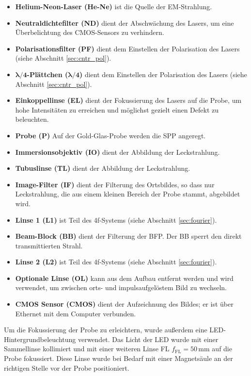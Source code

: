 \documentclass[a4paper, titlepage,  ngerman]{book}
\begin{document}
		\begin{itemize}
			\item \textbf{Helium-Neon-Laser (He-Ne)} ist die Quelle der EM-Strahlung.
			\item \textbf{Neutraldichtefilter (ND)} dient der Abschwächung des Lasers, um eine Überbelichtung des CMOS-Sensors zu verhindern.
			\item \textbf{Polarisationsfilter (PF)} dient dem Einstellen der Polarisation des Lasers (siehe Abschnitt \ref{sec:cntr_pol}).
			\item $\boldsymbol{\lambda / 4}$\textbf{-Plättchen (}$\boldsymbol{\lambda / 4}$\textbf{)} dient dem Einstellen der Polarisation des Lasers (siehe Abschnitt \ref{sec:cntr_pol}).
			\item \textbf{Einkoppellinse (EL)} dient der Fokussierung des Lasers auf die Probe, um hohe Intensitäten zu erreichen und möglichst gezielt einen Defekt zu beleuchten.
			\item \textbf{Probe (P)} Auf der Gold-Glas-Probe werden die SPP angeregt.
			\item \textbf{Immersionsobjektiv (IO)} dient der Abbildung der Leckstrahlung.
			\item \textbf{Tubuslinse (TL)} dient der Abbildung der Leckstrahlung.
			\item \textbf{Image-Filter (IF)} dient der Filterung des Ortsbildes, so dass nur Leckstrahlung, die aus einem kleinen Bereich der Probe stammt, abgebildet wird.			
			\item \textbf{Linse 1 (L1)} ist Teil des 4f-Systems (siehe Abschnitt \ref{sec:fourier}).
			\item \textbf{Beam-Block (BB)} dient der Filterung der BFP. Der BB sperrt den direkt transmittierten Strahl.			
			\item \textbf{Linse 2 (L2)} ist Teil des 4f-Systems (siehe Abschnitt \ref{sec:fourier}).
			\item \textbf{Optionale Linse (OL)} kann aus dem Aufbau entfernt werden und wird verwendet, um zwischen orts- und impulsaufgelöstem Bild zu wechseln.
			\item \textbf{CMOS Sensor (CMOS)}  dient der Aufzeichnung des Bildes; er ist über Ethernet mit dem Computer verbunden.			
		\end{itemize}
		Um die Fokussierung der Probe zu erleichtern, wurde außerdem eine LED-Hintergrundbeleuchtung verwendet. Das Licht der LED wurde mit einer Sammellinse kollimiert und mit einer weiteren Linse FL $f_{\mathrm{FL}}=50\,\mathrm{mm}$ auf die  Probe fokussiert. Diese Linse wurde bei Bedarf mit einer Magnetsäule an der richtigen Stelle vor der Probe positioniert.
		
\end{document}
